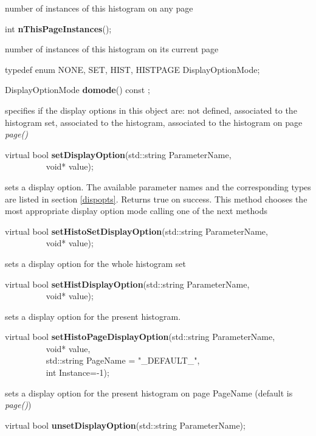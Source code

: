  number of instances of this histogram on any page


\item    int {\bf nThisPageInstances}();


 number of instances of this histogram on its current page


\item   typedef enum { NONE, SET, HIST, HISTPAGE } DisplayOptionMode;
\item    DisplayOptionMode {\bf domode}() const ;

 specifies if the display options in this object are: not defined,
 associated to the histogram set, associated to the histogram,
 associated to the histogram on  page {\it page()}


\item    virtual bool {\bf setDisplayOption}(std::string ParameterName,\\\mbox{}~~~~~~~~~ 
				void* value);

 sets a display option.  The available parameter names and the corresponding types are listed 
 in section \ref{dispopts}. Returns true on success.
 This method chooses the most appropriate display option mode calling one of the next methods  


\item    virtual bool {\bf setHistoSetDisplayOption}(std::string ParameterName,\\\mbox{}~~~~~~~~~ 
					void* value);

 sets a display option for the whole histogram set


\item    virtual bool {\bf setHistDisplayOption}(std::string ParameterName,\\\mbox{}~~~~~~~~~ 
				void* value);

 sets a display option for the present histogram.


\item    virtual bool {\bf setHistoPageDisplayOption}(std::string ParameterName,\\\mbox{}~~~~~~~~~ 
					 void* value,\\\mbox{}~~~~~~~~~
					 std::string PageName = "\_DEFAULT\_",\\\mbox{}~~~~~~~~~
					 int Instance=-1);

 sets a display option for the present histogram on page PageName (default is {\it page()})


\item    virtual bool {\bf unsetDisplayOption}(std::string ParameterName);


